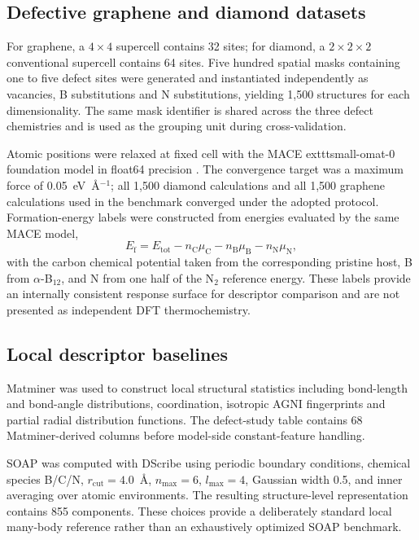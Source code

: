 \documentclass[twoside,twocolumn,9pt]{article}
\begin{document}
\subsection*{Defective graphene and diamond datasets}

For graphene, a \(4\times4\) supercell contains 32 sites; for diamond, a \(2\times2\times2\) conventional supercell contains 64 sites. Five hundred spatial masks containing one to five defect sites were generated and instantiated independently as vacancies, B substitutions and N substitutions, yielding 1,500 structures for each dimensionality. The same mask identifier is shared across the three defect chemistries and is used as the grouping unit during cross-validation.

Atomic positions were relaxed at fixed cell with the MACE 	exttt{small-omat-0} foundation model in float64 precision \cite{Batatia2022,Batatia2025}. The convergence target was a maximum force of 0.05~eV~\AA\(^{-1}\); all 1,500 diamond calculations and all 1,500 graphene calculations used in the benchmark converged under the adopted protocol. Formation-energy labels were constructed from energies evaluated by the same MACE model,
\begin{equation}
E_{\mathrm f}=E_{\mathrm{tot}}-n_{\mathrm C}\mu_{\mathrm C}
-n_{\mathrm B}\mu_{\mathrm B}-n_{\mathrm N}\mu_{\mathrm N},
\end{equation}
with the carbon chemical potential taken from the corresponding pristine host, B from \(\alpha\)-B$_{12}$, and N from one half of the N$_2$ reference energy. These labels provide an internally consistent response surface for descriptor comparison and are not presented as independent DFT thermochemistry.

\subsection*{Local descriptor baselines}

Matminer \cite{Ward2018} was used to construct local structural statistics including bond-length and bond-angle distributions, coordination, isotropic AGNI fingerprints and partial radial distribution functions. The defect-study table contains 68 Matminer-derived columns before model-side constant-feature handling.

SOAP was computed with DScribe \cite{Himanen2020} using periodic boundary conditions, chemical species B/C/N, \(r_{\mathrm{cut}}=4.0\)~\AA, \(n_{\max}=6\), \(l_{\max}=4\), Gaussian width 0.5, and inner averaging over atomic environments. The resulting structure-level representation contains 855 components. These choices provide a deliberately standard local many-body reference rather than an exhaustively optimized SOAP benchmark.
\end{document}
